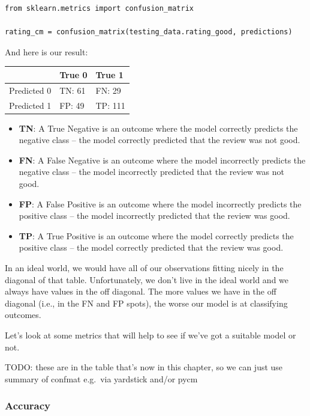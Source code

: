 \documentclass[
  letterpaper,
]{krantz}
\begin{document}
\begin{verbatim}
from sklearn.metrics import confusion_matrix

rating_cm = confusion_matrix(testing_data.rating_good, predictions)
\end{verbatim}

And here is our result:

\begin{longtable*}{cll}
\toprule
  & True 0 & True 1 \\ 
\midrule\addlinespace[2.5pt]
Predicted 0 & TN: 61 & FN: 29 \\ 
Predicted 1 & FP: 49 & TP: 111 \\ 
\bottomrule
\end{longtable*}

\begin{itemize}
\item
  \textbf{TN}: A True Negative is an outcome where the model correctly
  predicts the negative class -- the model correctly predicted that the
  review was not good.
\item
  \textbf{FN}: A False Negative is an outcome where the model
  incorrectly predicts the negative class -- the model incorrectly
  predicted that the review was not good.
\item
  \textbf{FP}: A False Positive is an outcome where the model
  incorrectly predicts the positive class -- the model incorrectly
  predicted that the review was good.
\item
  \textbf{TP}: A True Positive is an outcome where the model correctly
  predicts the positive class -- the model correctly predicted that the
  review was good.
\end{itemize}

In an ideal world, we would have all of our observations fitting nicely
in the diagonal of that table. Unfortunately, we don't live in the ideal
world and we always have values in the off diagonal. The more values we
have in the off diagonal (i.e., in the FN and FP spots), the worse our
model is at classifying outcomes.

Let's look at some metrics that will help to see if we've got a suitable
model or not.

TODO: these are in the table that's now in this chapter, so we can just
use summary of confmat e.g.~via yardstick and/or pycm

\subsubsection{Accuracy}\label{accuracy}
\end{document}
